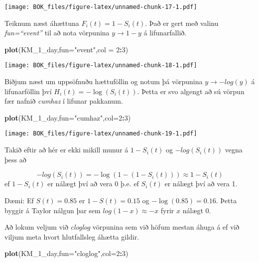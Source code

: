 \documentclass[
]{book}
\newenvironment{Shaded}{\begin{snugshade}}{\end{snugshade}}
\newcommand{\DataTypeTok}[1]{\textcolor[rgb]{0.13,0.29,0.53}{#1}}
\newcommand{\DecValTok}[1]{\textcolor[rgb]{0.00,0.00,0.81}{#1}}
\newcommand{\KeywordTok}[1]{\textcolor[rgb]{0.13,0.29,0.53}{\textbf{#1}}}
\newcommand{\NormalTok}[1]{#1}
\newcommand{\OperatorTok}[1]{\textcolor[rgb]{0.81,0.36,0.00}{\textbf{#1}}}
\newcommand{\StringTok}[1]{\textcolor[rgb]{0.31,0.60,0.02}{#1}}
\begin{document}
\texttt{[image: BOK\_files/figure-latex/unnamed-chunk-17-1.pdf]}

Teiknum næst áhættuna \(F_i(t)=1-S_i(t)\). Það er gert með valinu \emph{fun=``event''} til að nota vörpunina \(y \to 1-y\) á lifunarfallið.

\begin{Shaded}
\begin{Highlighting}[]
\KeywordTok{plot}\NormalTok{(KM_}\DecValTok{1}\NormalTok{_day,}\DataTypeTok{fun=}\StringTok{"event"}\NormalTok{,}\DataTypeTok{col =} \DecValTok{2}\OperatorTok{:}\DecValTok{3}\NormalTok{)}
\end{Highlighting}
\end{Shaded}

\texttt{[image: BOK\_files/figure-latex/unnamed-chunk-18-1.pdf]}

Biðjum næst um uppsöfnuðu hættuföllin og notum þá vörpunina \(y \to -log(y)\) á lifunarföllin því \(H_i(t) = -\log(S_i(t))\). Þetta er svo algengt að sú vörpun fær nafnið \emph{cumhaz} í lifunar pakkanum.

\begin{Shaded}
\begin{Highlighting}[]
\KeywordTok{plot}\NormalTok{(KM_}\DecValTok{1}\NormalTok{_day,}\DataTypeTok{fun=}\StringTok{"cumhaz"}\NormalTok{,}\DataTypeTok{col=}\DecValTok{2}\OperatorTok{:}\DecValTok{3}\NormalTok{)}
\end{Highlighting}
\end{Shaded}

\texttt{[image: BOK\_files/figure-latex/unnamed-chunk-19-1.pdf]}

Takið eftir að hér er ekki mikill munur á \(1-S_i(t)\) og \(-log(S_i(t))\) vegna þess að

\[
-log(S_i(t))=-\log(1-(1-S_i(t))) \approx 1-S_i(t)
\]
ef \(1-S_i(t)\) er nálægt því að vera 0 þ.e. ef \(S_i(t)\) er nálægt því að vera 1.

Dæmi: Ef \(S(t)=0.85\) er \(1-S(t)=0.15\) og \(-\log(0.85)=0.16\). Þetta byggir á Taylor nálgun þar sem \(log(1-x) \approx -x\) fyrir \(x\) nálægt 0.

Að lokum veljum við \emph{cloglog} vörpunina sem við höfum mestan áhuga á ef við viljum meta hvort hlutfallsleg áhætta gildir.

\begin{Shaded}
\begin{Highlighting}[]
\KeywordTok{plot}\NormalTok{(KM_}\DecValTok{1}\NormalTok{_day,}\DataTypeTok{fun=}\StringTok{"cloglog"}\NormalTok{,}\DataTypeTok{col=}\DecValTok{2}\OperatorTok{:}\DecValTok{3}\NormalTok{)}
\end{Highlighting}
\end{Shaded}
\end{document}
